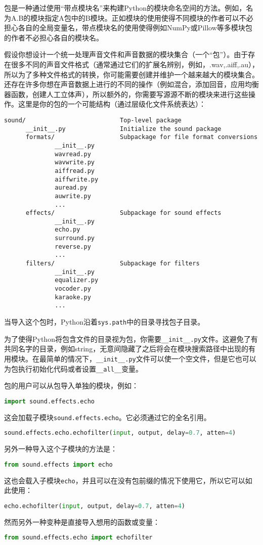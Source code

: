 \documentclass[../modules.tex]{subfiles}
\begin{document}
包是一种通过使用“带点模块名”来构建Python的模块命名空间的方法。例如，名为A.B的模块指定A包中的B模块。正如模块的使用使得不同模块的作者可以不必担心各自的全局变量名，带点模块名的使用使得例如NumPy或Pillow等多模块包的作者不必担心各自的模块名。

假设你想设计一个统一处理声音文件和声音数据的模块集合（一个“包”）。由于存在很多不同的声音文件格式（通常通过它们的扩展名辨别，例如，.wav,.aiff,.au），所以为了多种文件格式的转换，你可能需要创建并维护一个越来越大的模块集合。还存在许多你想在声音数据上进行的不同的操作（例如混合，添加回音，应用均衡器函数，创建人工立体声），所以额外的，你需要写源源不断的模块来进行这些操作。这里是你的包的一个可能结构（通过层级化文件系统表达）：
\begin{lstlisting}
sound/                          Top-level package
      __init__.py               Initialize the sound package
      formats/                  Subpackage for file format conversions
              __init__.py
              wavread.py
              wavwrite.py
              aiffread.py
              aiffwrite.py
              auread.py
              auwrite.py
              ...
      effects/                  Subpackage for sound effects
              __init__.py
              echo.py
              surround.py
              reverse.py
              ...
      filters/                  Subpackage for filters
              __init__.py
              equalizer.py
              vocoder.py
              karaoke.py
              ...
\end{lstlisting}
当导入这个包时，Python沿着\lstinline{sys.path}中的目录寻找包子目录。

为了使得Python将包含文件的目录视为包，你需要\lstinline{__init__.py}文件。这避免了有共同名字的目录，例如string，无意间隐藏了之后将会在模块搜索路径中出现的有用模块。在最简单的情况下，\lstinline{__init__.py}文件可以使一个空文件，但是它也可以为包执行初始化代码或者设置\lstinline{__all__}变量。

包的用户可以从包导入单独的模块，例如：
\begin{lstlisting}[language=Python]
import sound.effects.echo
\end{lstlisting}
这会加载子模块\lstinline{sound.effects.echo}。它必须通过它的全名引用。
\begin{lstlisting}[language=Python]
sound.effects.echo.echofilter(input, output, delay=0.7, atten=4)
\end{lstlisting}
另外一种导入这个子模块的方法是：
\begin{lstlisting}[language=Python]
from sound.effects import echo
\end{lstlisting}
这也会载入子模块\lstinline{echo}，并且可以在没有包前缀的情况下使用它，所以它可以如此使用：
\begin{lstlisting}[language=Python]
echo.echofilter(input, output, delay=0.7, atten=4)
\end{lstlisting}
然而另外一种变种是直接导入想用的函数或变量：
\begin{lstlisting}[language=Python]
from sound.effects.echo import echofilter
\end{lstlisting}
\end{document}

